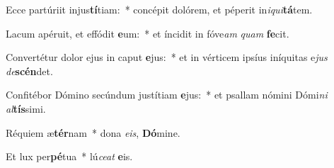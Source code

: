 \item Ecce partúriit injus\textbf{tí}tiam:~* concépit dolórem, et péperit in\textit{i}\textit{qui}\textbf{tá}tem.

\item Lacum apéruit, et effódit \textbf{e}um:~* et íncidit in fóve\textit{am} \textit{quam} \textbf{fe}cit.

\item Convertétur dolor ejus in caput \textbf{e}jus:~* et in vérticem ipsíus iníquitas e\textit{jus} \textit{de}\textbf{scén}det.

\item Confitébor Dómino secúndum justítiam \textbf{e}jus:~* et psallam nómini Dómi\textit{ni} \textit{al}\textbf{tís}simi.

\item Réquiem æ\textbf{tér}nam~* dona \textit{e}\textit{is}, \textbf{Dó}mine.

\item Et lux per\textbf{pé}tua~* lú\textit{ce}\textit{at} \textbf{e}is.